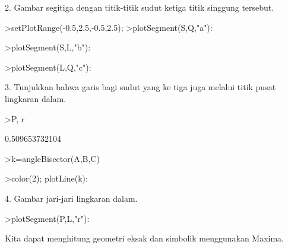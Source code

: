 \documentclass[12pt,arial,letterpaper]{book}
\begin{document}
\begin{eulernootebook}
\begin{eulercomment}
\begin{eulercomment}
\begin{eulernootebook}
\begin{eulercomment}
\begin{eulercomment}
\begin{eulercomment}
\begin{eulercomment}
\begin{eulercomment}
\begin{eulercomment}
\begin{eulernotebook}
\begin{eulercomment}
\begin{eulercomment}
\begin{eulercomment}
2. Gambar segitiga dengan titik-titik sudut ketiga titik singgung
tersebut.
\end{eulercomment}
\begin{eulerprompt}
>setPlotRange(-0.5,2.5,-0.5,2.5);
>plotSegment(S,Q,"a"):
\end{eulerprompt}
\begin{eulerprompt}
>plotSegment(S,L,"b"):
\end{eulerprompt}
\begin{eulerprompt}
>plotSegment(L,Q,"c"):
\end{eulerprompt}
\begin{eulercomment}
3. Tunjukkan bahwa garis bagi sudut yang ke tiga juga melalui titik
pusat lingkaran dalam.
\end{eulercomment}
\begin{eulerprompt}
>P, r
\end{eulerprompt}
\begin{euleroutput}
  [0.86038,  0.86038]
  0.509653732104
\end{euleroutput}
\begin{eulerprompt}
>k=angleBisector(A,B,C)
\end{eulerprompt}
\begin{euleroutput}
  [-0.264911,  -1.63246,  -1.63246]
\end{euleroutput}
\begin{eulerprompt}
>color(2); plotLine(k):
\end{eulerprompt}
\begin{eulercomment}
4. Gambar jari-jari lingkaran dalam.
\end{eulercomment}
\begin{eulerprompt}
>plotSegment(P,L,"r"):
\end{eulerprompt}
\begin{eulercomment}
Kita dapat menghitung geometri eksak dan simbolik menggunakan Maxima.


\end{eulercomment}
\end{eulercomment}
\end{eulercomment}
\end{eulernotebook}
\end{eulercomment}
\end{eulercomment}
\end{eulercomment}
\end{eulercomment}
\end{eulercomment}
\end{eulercomment}
\end{eulernootebook}
\end{eulercomment}
\end{eulercomment}
\end{eulernootebook}
\end{document}
